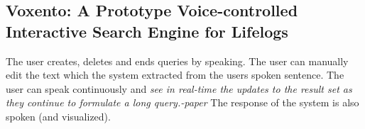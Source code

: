 \subsection{Voxento: A Prototype Voice-controlled Interactive Search Engine for Lifelogs}
The user creates, deletes and ends queries by speaking. The user can manually edit the text which the system extracted from the users spoken sentence. The user can speak continuously and \textit{see in real-time the updates to the result set as they continue to formulate a long query.-paper} The response of the system is also spoken (and visualized).